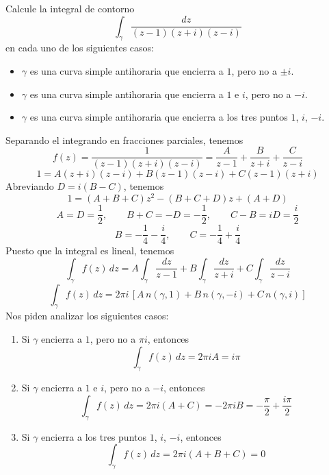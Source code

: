 \begin{exercise}
Calcule la integral de contorno
$$\int_\gamma \frac {dz} {(z-1) (z+i) (z-i)}$$
en cada uno de los siguientes casos:
\begin{itemize}
    \item $\gamma$ es una curva simple antihoraria que encierra a $1$, pero no a $\pm i$.
    \item $\gamma$ es una curva simple antihoraria que encierra a $1$ e $i$, pero no a $-i$.
    \item $\gamma$ es una curva simple antihoraria que encierra a los tres puntos $1$, $i$, $-i$.
\end{itemize}
\end{exercise}

\begin{solution}
Separando el integrando en fracciones parciales, tenemos
$$f(z) = \frac 1 {(z-1) (z+i) (z-i)} = \frac A {z-1} + \frac B {z+i} + \frac C {z-i}$$
$$1 = A (z+i) (z-i) + B (z-1) (z-i) + C (z-1) (z+i)$$
Abreviando $D = i(B - C)$, tenemos
$$1 = (A + B + C) z^2 - (B + C + D) z + (A + D)$$
$$A = D = \frac 12, \qquad B + C = -D = -\frac 12, \qquad C - B = iD = \frac i2$$
$$B = -\frac 14 - \frac i4, \qquad C = -\frac 14 + \frac i4$$
Puesto que la integral es lineal, tenemos
$$
\int_\gamma f(z) \, dz
    = A \int_\gamma \frac {dz} {z-1}
    + B \int_\gamma \frac {dz} {z+i}
    + C \int_\gamma \frac {dz} {z-i}
$$
$$
\int_\gamma f(z) \, dz = 2\pi i \, [
    A \, n(\gamma, 1) +
    B \, n(\gamma, -i) +
    C \, n(\gamma, i)]
$$
Nos piden analizar los siguientes casos:
\begin{enumerate}[label=(\alph*)]
    \item Si $\gamma$ encierra a $1$, pero no a $\pi i$, entonces
    $$\int_\gamma f(z) \, dz = 2\pi iA = i\pi$$
    
    \item Si $\gamma$ encierra a $1$ e $i$, pero no a $-i$, entonces
    $$\int_\gamma f(z) \, dz = 2\pi i (A + C) = -2\pi iB = -\frac \pi 2 + \frac {i\pi} 2$$
    
    \item Si $\gamma$ encierra a los tres puntos $1$, $i$, $-i$, entonces
    $$\int_\gamma f(z) \, dz = 2\pi i (A + B + C) = 0$$
\end{enumerate}
\end{solution}
